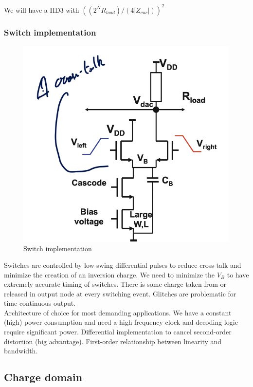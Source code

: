 \documentclass{report}
\begin{document}
We will have a HD3 with $((2^N R_{load})/(4|Z_{cur}|))^2$

\subsubsection{Switch implementation}

\begin{figure}
    \centering
    \includegraphics[width=0.9\linewidth]{img/switch_impl.png}
    \caption{Switch implementation}
    \label{fig:switch-impl-label}
\end{figure}

Switches are controlled by low-swing differential pulses to reduce cross-talk and minimize the creation of an inversion charge. We need to minimize the $V_B$ to have extremely accurate timing of switches. There is some charge taken from or released in output node at every switching event. Glitches are problematic for time-continuous output.\\

Architecture of choice for most demanding applications. We have a constant (high) power consumption and need a high-frequency clock and decoding logic require significant power. Differential implementation to cancel second-order distortion (big advantage). First-order relationship between linearity and bandwidth.

\subsection{Charge domain}
\end{document}
